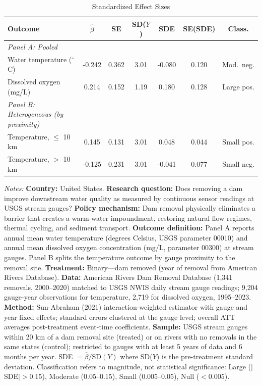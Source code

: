 \begin{table}[t]
\centering
\caption{Standardized Effect Sizes}
\label{tab:sde}
\footnotesize
\begin{tabular}{lcccccc}
\hline\hline
Outcome & $\hat{\beta}$ & SE & SD($Y$) & SDE & SE(SDE) & Class. \\
\hline
\textit{Panel A: Pooled} \\
Water temperature ($^{\circ}$C) & -0.242 & 0.362 & 3.01 & -0.080 & 0.120 & Mod.\ neg. \\
Dissolved oxygen (mg/L) & 0.214 & 0.152 & 1.19 & 0.180 & 0.128 & Large pos. \\
[0.5em]
\textit{Panel B: Heterogeneous (by proximity)} \\
Temperature, $\leq$ 10 km & 0.145 & 0.131 & 3.01 & 0.048 & 0.044 & Small pos. \\
Temperature, $>$ 10 km & -0.125 & 0.231 & 3.01 & -0.041 & 0.077 & Small neg. \\
\hline\hline
\end{tabular}
\par\vspace{0.5em}
\begin{minipage}{\textwidth}
\small
\textit{Notes:} \textbf{Country:} United States. \textbf{Research question:} Does removing a dam improve downstream water quality as measured by continuous sensor readings at USGS stream gauges? \textbf{Policy mechanism:} Dam removal physically eliminates a barrier that creates a warm-water impoundment, restoring natural flow regimes, thermal cycling, and sediment transport. \textbf{Outcome definition:} Panel A reports annual mean water temperature (degrees Celsius, USGS parameter 00010) and annual mean dissolved oxygen concentration (mg/L, parameter 00300) at stream gauges. Panel B splits the temperature outcome by gauge proximity to the removal site. \textbf{Treatment:} Binary---dam removed (year of removal from American Rivers Database). \textbf{Data:} American Rivers Dam Removal Database (1,341 removals, 2000--2020) matched to USGS NWIS daily stream gauge readings; 9,204 gauge-year observations for temperature, 2,719 for dissolved oxygen, 1995--2023. \textbf{Method:} Sun-Abraham (2021) interaction-weighted estimator with gauge and year fixed effects; standard errors clustered at the gauge level; overall ATT averages post-treatment event-time coefficients. \textbf{Sample:} USGS stream gauges within 20 km of a dam removal site (treated) or on rivers with no removals in the same states (control); restricted to gauges with at least 5 years of data and 6 months per year. SDE $= \hat{\beta} / \text{SD}(Y)$ where SD($Y$) is the pre-treatment standard deviation. Classification refers to magnitude, not statistical significance: Large ($|$SDE$| > 0.15$), Moderate ($0.05$--$0.15$), Small ($0.005$--$0.05$), Null ($< 0.005$).
\end{minipage}
\end{table}


